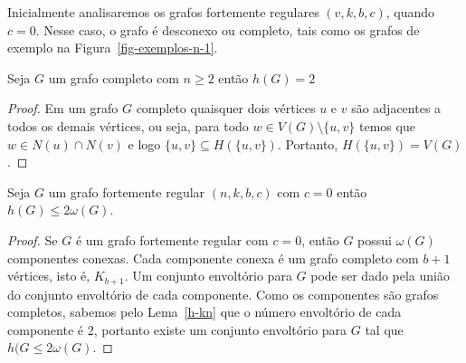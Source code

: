 Inicialmente analisaremos os grafos fortemente regulares $(v,k,b,c)$, quando $c=0$. Nesse caso, o grafo é desconexo ou completo, tais como os grafos de exemplo na Figura~\ref{fig-exemplos-n-1}.

\begin{lemma}
Seja $G$ um grafo completo com $n \ge 2$ então $h(G)=2$
\label{h-kn}
\end{lemma}
\begin{proof}
Em um grafo $G$ completo quaisquer dois vértices $u$ e $v$ são adjacentes a todos os demais vértices,
ou seja, para todo $w \in V(G)\setminus \{u,v\}$ temos que $w\in N(u)\cap N(v)$ e logo $\{u,v\} \subseteq H(\{u,v\})$. Portanto, $H(\{u,v\}) = V(G)$.
\end{proof}

\begin{theorem}
\label{teor-c-0}
Seja $G$ um grafo fortemente regular $(n,k,b,c)$ com $c=0$ então $h(G)\le 2\omega(G)$.
\end{theorem}
\begin{proof}
Se $G$ é um grafo fortemente regular com $c=0$, então $G$ possui $\omega(G)$ componentes conexas. Cada componente conexa é um grafo completo com $b+1$ vértices, isto é, $K_{b+1}$. 
Um conjunto envoltório para $G$ pode ser dado pela união do conjunto envoltório de cada componente.
Como os componentes são grafos completos, sabemos pelo Lema~\ref{h-kn} que o número envoltório de cada componente é 2, portanto existe um conjunto envoltório para $G$ tal que $h(G\le 2\omega(G)$.
\end{proof}



